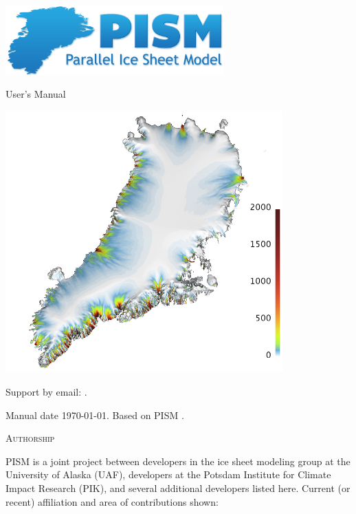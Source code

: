 \documentclass[titlepage,letterpaper,final]{scrartcl}
\begin{document}
\graphicspath{{figs/}}

\begin{titlepage}

  \begin{center}

    \includegraphics[width=3.3in,keepaspectratio=true]{pism-logo}

    \vspace{2.0cm}
    {\huge {} User's Manual}
    \vspace{2.0cm}

    \includegraphics[width=4.2in,keepaspectratio=true]{grn-1km-csurf}
    \vfill

    \small Support by email: \PISMEMAIL.
    \medskip

    Manual date \today. Based on PISM \PISMREV.
    \medskip

    \PISMDOWNLOADMSG
  \end{center}
\end{titlepage}

\newpage
\phantom{bob}

\centerline{\textsc{Authorship}}
\bigskip

\normalspacing
PISM is a joint project between developers in the ice sheet modeling group at the University of Alaska (UAF), developers at the Potsdam Institute for Climate Impact Research (PIK), and several additional developers listed here.  Current (or recent) affiliation and area of contributions shown:
\bigskip
\normalspacing
\end{document}
